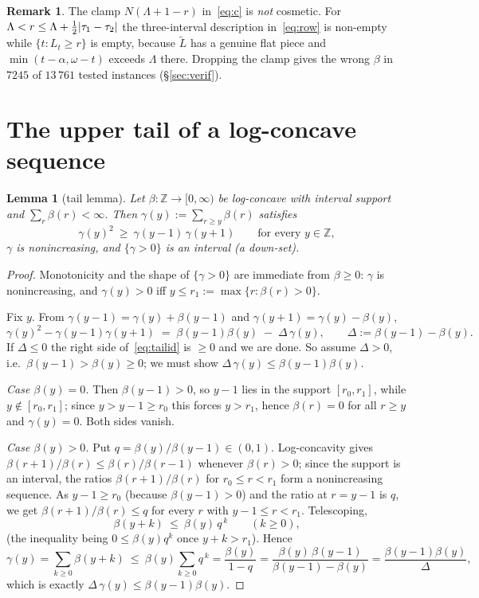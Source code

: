 \documentclass[11pt]{article}
\newtheorem{lemma}[theorem]{Lemma}
\theoremstyle{definition}
\newtheorem{remark}[theorem]{Remark}
\newcommand{\Z}{\mathbb Z}
\DeclarePairedDelimiter{\abs}{\lvert}{\rvert}
\begin{document}
\begin{remark}
The clamp $N(\Lambda+1-r)$ in~\eqref{eq:c} is \emph{not} cosmetic. For
$\Lambda<r\le\Lambda+\tfrac12\abs{\tau_1-\tau_2}$ the three-interval description
in~\eqref{eq:row} is non-empty while $\{t:L_t\ge r\}$ is empty, because
$\widetilde L$ has a genuine flat piece and $\min(t-\alpha,\omega-t)$ exceeds $\Lambda$
there. Dropping the clamp gives the wrong $\beta$ in $7245$ of $13\,761$ tested instances
(§\ref{sec:verif}).
\end{remark}

\section{The upper tail of a log-concave sequence}\label{sec:tail}

\begin{lemma}[tail lemma]\label{lem:tail}
Let $\beta:\Z\to[0,\infty)$ be log-concave with interval support and $\sum_r\beta(r)<\infty$.
Then $\gamma(y):=\sum_{r\ge y}\beta(r)$ satisfies
\[
  \gamma(y)^2\ \ge\ \gamma(y-1)\,\gamma(y+1)\qquad\text{for every }y\in\Z,
\]
$\gamma$ is nonincreasing, and $\{\gamma>0\}$ is an interval \textup{(}a down-set\textup{)}.
\end{lemma}
\begin{proof}
Monotonicity and the shape of $\{\gamma>0\}$ are immediate from $\beta\ge0$: $\gamma$ is
nonincreasing, and $\gamma(y)>0$ iff $y\le r_1:=\max\{r:\beta(r)>0\}$.

Fix $y$. From $\gamma(y-1)=\gamma(y)+\beta(y-1)$ and $\gamma(y+1)=\gamma(y)-\beta(y)$,
\begin{equation}\label{eq:tailid}
  \gamma(y)^2-\gamma(y-1)\gamma(y+1)
  \;=\;\beta(y-1)\beta(y)\;-\;\Delta\,\gamma(y),
  \qquad \Delta:=\beta(y-1)-\beta(y).
\end{equation}
If $\Delta\le0$ the right side of~\eqref{eq:tailid} is $\ge0$ and we are done. So assume
$\Delta>0$, i.e.\ $\beta(y-1)>\beta(y)\ge0$; we must show
$\Delta\,\gamma(y)\le\beta(y-1)\beta(y)$.

\emph{Case $\beta(y)=0$.} Then $\beta(y-1)>0$, so $y-1$ lies in the support
$[r_0,r_1]$, while $y\notin[r_0,r_1]$; since $y>y-1\ge r_0$ this forces $y>r_1$, hence
$\beta(r)=0$ for all $r\ge y$ and $\gamma(y)=0$. Both sides vanish.

\emph{Case $\beta(y)>0$.} Put $q=\beta(y)/\beta(y-1)\in(0,1)$. Log-concavity gives
$\beta(r+1)/\beta(r)\le\beta(r)/\beta(r-1)$ whenever $\beta(r)>0$; since the support is an
interval, the ratios $\beta(r+1)/\beta(r)$ for $r_0\le r<r_1$ form a nonincreasing sequence.
As $y-1\ge r_0$ (because $\beta(y-1)>0$) and the ratio at $r=y-1$ is $q$, we get
$\beta(r+1)/\beta(r)\le q$ for every $r$ with $y-1\le r<r_1$. Telescoping,
\[
  \beta(y+k)\ \le\ \beta(y)\,q^{\,k}\qquad (k\ge0),
\]
(the inequality being $0\le\beta(y)q^k$ once $y+k>r_1$). Hence
\[
  \gamma(y)=\sum_{k\ge0}\beta(y+k)\ \le\ \beta(y)\sum_{k\ge0}q^{\,k}
  =\frac{\beta(y)}{1-q}
  =\frac{\beta(y)\,\beta(y-1)}{\beta(y-1)-\beta(y)}
  =\frac{\beta(y-1)\beta(y)}{\Delta},
\]
which is exactly $\Delta\,\gamma(y)\le\beta(y-1)\beta(y)$.
\end{proof}
\end{document}
